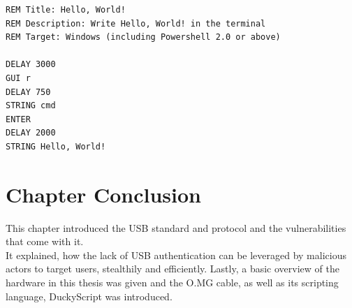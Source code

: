 \begin{verbatim}
REM Title: Hello, World!
REM Description: Write Hello, World! in the terminal
REM Target: Windows (including Powershell 2.0 or above)

DELAY 3000
GUI r
DELAY 750
STRING cmd
ENTER
DELAY 2000
STRING Hello, World!
\end{verbatim}



\section{Chapter Conclusion}

This chapter introduced the USB standard and protocol and the vulnerabilities that come with it. \\
It explained, how the lack of USB authentication can be leveraged by malicious actors to target users, stealthily and efficiently. 
Lastly, a basic overview of the hardware in this thesis was given and the O.MG cable, as well as its scripting language, DuckyScript was introduced. 